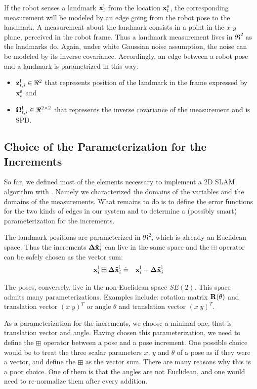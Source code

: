 \documentclass[a4paper]{article}
\begin{document}
If the robot senses a landmark $\mathbf{x}^\mathrm{l}_i$ from the location
$\mathbf{x}^\mathrm{s}_t$, the corresponding measurement will be modeled by
an edge going from the robot pose to the landmark. A measurement about
the landmark consists in a point in the $x$-$y$ plane, perceived in the
robot frame. Thus a landmark measurement lives in $\Re^2$ as the
landmarks do. Again, under white Gaussian noise assumption, the
noise can be modeled by its inverse covariance. Accordingly, an edge between
a robot pose and a landmark is parametrized in this way:
\begin{itemize}
\item $\mathbf{z}^\mathrm{l}_{t,i} \in \Re^2$ that represents position of the landmark
  in the frame expressed by $\mathbf{x}^\mathrm{s}_t$ and
\item $\mathbf{\Omega}^\mathrm{l}_{t,i} \in \Re^{2 \times 2}$ that represents the inverse
  covariance of the measurement and is SPD.
\end{itemize}

\subsection{Choice of the Parameterization for the Increments}
So far, we defined most of the elements necessary to implement a 2D
SLAM algorithm with \gopt{}.  Namely we characterized the domains of
the variables and the domains of the measurements.  What remains to do
is to define the error functions for the two kinds of edges in our
system and to determine a (possibly smart) parameterization for the
increments.


The landmark positions are parameterized in $\Re^2$, which is already
an Euclidean space. Thus the increments $\mathbf{\Delta \tilde x}^\mathrm{l}_i$ can live in the same space and the
 $\boxplus$ operator can be safely chosen as the vector sum:
\begin{eqnarray}
  \mathbf{x}^\mathrm{l}_i \boxplus \mathbf{\Delta \tilde x}^\mathrm{l}_i   & \doteq & \mathbf{x}^\mathrm{l}_i + \mathbf{\Delta \tilde x}^\mathrm{l}_i
\end{eqnarray}

The poses, conversely, live in the non-Euclidean space $SE(2)$.
This space admits many parameterizations. Examples include:
rotation matrix $\mathbf{R}(\theta)$ and translation vector $(x \; y)^T$ or
angle $\theta$ and translation vector $(x \; y)^T$.

As a parameterization for the increments, we choose a minimal one,
that is translation vector and angle. Having chosen this
parameterization, we need to define the $\boxplus$ operator between a
pose and a pose increment.  One possible choice would be to treat the
three scalar parameters $x$, $y$ and $\theta$ of a pose as if they
were a vector, and define the $\boxplus$ as the vector sum.  There are
many reasons why this is a poor choice. One of them is that the angles
are not Euclidean, and one would need to re-normalize them after every
addition.
\end{document}
